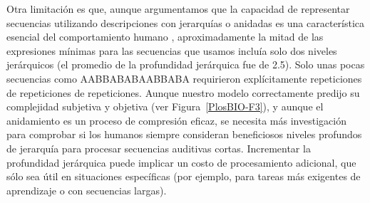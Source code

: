 
Otra limitación es que, aunque argumentamos que la capacidad de representar secuencias utilizando descripciones con jerarquías o anidadas es una característica esencial del comportamiento humano \cite{f4}, aproximadamente la mitad de las expresiones mínimas para las secuencias que usamos incluía solo dos niveles jerárquicos (el promedio de la profundidad jerárquica fue de 2.5). Solo unas pocas secuencias como AABBABABAABBABA requirieron explícitamente repeticiones de repeticiones de repeticiones. Aunque nuestro modelo correctamente predijo su complejidad subjetiva y objetiva (ver Figura~\ref{PlosBIO-F3}), y aunque el anidamiento es un proceso de compresión eficaz, se necesita más investigación para comprobar si los humanos siempre consideran beneficiosos niveles profundos de jerarquía para procesar secuencias auditivas cortas. Incrementar la profundidad jerárquica puede implicar un costo de procesamiento adicional, que sólo sea útil en situaciones específicas (por ejemplo, para tareas más exigentes de aprendizaje o con secuencias largas).

